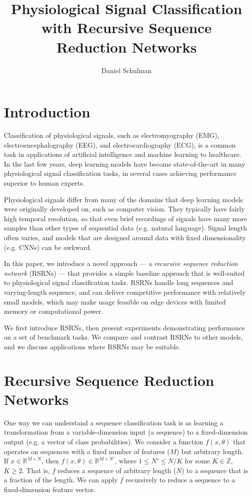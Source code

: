 \documentclass{article}
\title{Physiological Signal Classification with Recursive Sequence Reduction Networks}
\author{Daniel Schulman}
\newcommand{\real}{\mathbb{R}}
\begin{document}
\maketitle

\section{Introduction}

Classification of physiological signals, such as electromyography (EMG), electroencephalography (EEG), and electrocardiography (ECG), is a common task in applications of artificial intelligence and machine learning to healthcare.
In the last few years, deep learning models have become state-of-the-art in many physiological signal classification tasks, in several cases achieving performance superior to human experts.

Physiological signals differ from many of the domains that deep learning models were originally developed on, such as computer vision.
They typically have fairly high temporal resolution, so that even brief recordings of signals have many more samples than other types of sequential data (e.g. natural language).
Signal length often varies, and models that are designed around data with fixed dimensionality (e.g. CNNs) can be awkward.

In this paper, we introduce a novel approach --- a \emph{recursive sequence reduction network} (RSRNs) --- that provides a simple baseline approach that is well-suited to physiological signal classification tasks.
RSRNs handle long sequences and varying-length sequence, and can deliver competitive performance with relatively small models, which may make usage feasible on edge devices with limited memory or computational power.

We first introduce RSRNs, then present experiments demonstrating performance on a set of benchmark tasks.
We compare and contrast RSRNs to other models, and we discuss applications where RSRNs may be suitable.

\section{Recursive Sequence Reduction Networks}

One way we can understand a sequence classification task is as learning a transformation from a variable-dimension input (a sequence) to a fixed-dimension output (e.g. a vector of class probabilities).
We consider a function $f(x,\theta)$ that operates on sequences with a fixed number of features ($M$) but arbitrary length.
If $x \in \real^{M \times N}$, then $f(x, \theta) \in \real^{M \times N'}$, where $1 \leq N' \leq N/K$ for some $K \in \mathbb{Z}$, $K \geq 2$.
That is, $f$ reduces a sequence of arbitrary length ($N$) to a sequence that is a fraction of the length.
We can apply $f$ recursively to reduce a sequence to a fixed-dimension feature vector.
\end{document}
